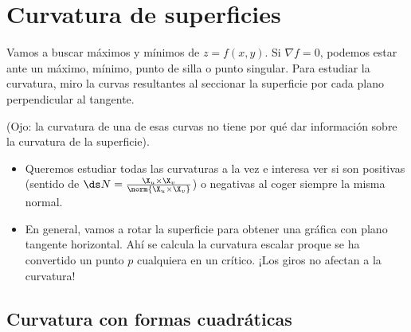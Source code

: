\section{Curvatura de superficies}

Vamos a buscar máximos y mínimos de $z = f(x,y)$. Si $\nabla f = 0$, podemos estar ante un máximo, mínimo, punto de silla o punto singular. Para estudiar la curvatura, miro la curvas resultantes al seccionar la superficie por cada plano perpendicular al tangente.

(Ojo: la curvatura de una de esas curvas no tiene por qué dar información sobre la curvatura de la superficie).

\begin{itemize}
	\item Queremos estudiar todas las curvaturas a la vez e interesa ver si son positivas (sentido de $\ds N=\frac{\X_u\times\X_v}{\norm{\X_u\times\X_v}}$) o negativas al coger siempre la misma normal.
	\item En general, vamos a rotar la superficie para obtener una gráfica con plano tangente horizontal. Ahí se calcula la curvatura escalar proque se ha convertido un punto $p$ cualquiera en un crítico. ¡Los giros no afectan a la curvatura!
\end{itemize}

\subsection{Curvatura con formas cuadráticas}

